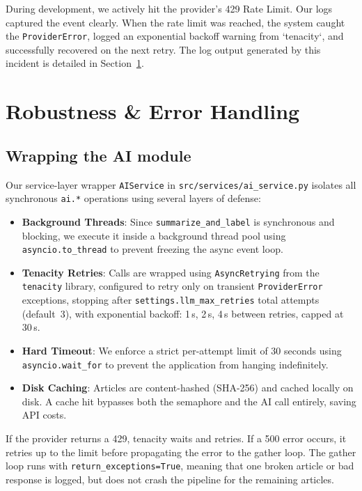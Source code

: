 \documentclass[11pt,a4paper]{article}
\begin{document}
During development, we actively hit the provider's 429 Rate Limit. Our logs captured the event clearly. When the rate limit was reached, the system caught the \texttt{ProviderError}, logged an exponential backoff warning from `tenacity`, and successfully recovered on the next retry. The log output generated by this incident is detailed in Section~\ref{sec:robustness}.

\section{Robustness \& Error Handling}\label{sec:robustness}

\subsection{Wrapping the AI module}

Our service-layer wrapper \texttt{AIService} in \texttt{src/services/ai\_service.py} isolates all synchronous \texttt{ai.*} operations using several layers of defense:
\begin{itemize}
    \item \textbf{Background Threads}: Since \texttt{summarize\_and\_label} is synchronous and blocking, we execute it inside a background thread pool using \texttt{asyncio.to\_thread} to prevent freezing the async event loop.
    \item \textbf{Tenacity Retries}: Calls are wrapped using \texttt{AsyncRetrying} from the \texttt{tenacity} library, configured to retry only on transient \texttt{ProviderError} exceptions, stopping after \texttt{settings.llm\_max\_retries} total attempts (default~3), with exponential backoff: 1\,s, 2\,s, 4\,s between retries, capped at 30\,s.
    \item \textbf{Hard Timeout}: We enforce a strict per-attempt limit of 30 seconds using \texttt{asyncio.wait\_for} to prevent the application from hanging indefinitely.
    \item \textbf{Disk Caching}: Articles are content-hashed (SHA-256) and cached locally on disk. A cache hit bypasses both the semaphore and the AI call entirely, saving API costs.
\end{itemize}

If the provider returns a 429, tenacity waits and retries. If a 500 error occurs, it retries up to the limit before propagating the error to the gather loop. The gather loop runs with \texttt{return\_exceptions=True}, meaning that one broken article or bad response is logged, but does not crash the pipeline for the remaining articles.
\end{document}
